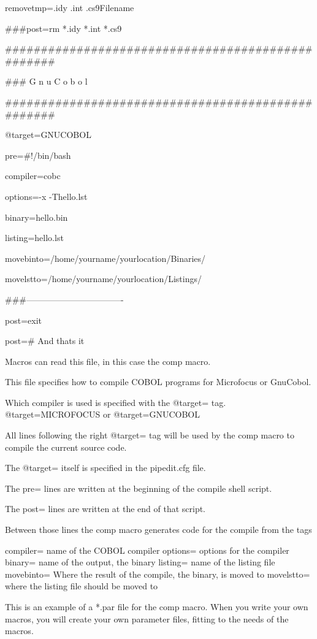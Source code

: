 \documentclass{report}
\begin{document}
removetmp=.idy .int .cs9Filename

\#\#\#post=rm *.idy *.int *.cs9

\#\#\#\#\#\#\#\#\#\#\#\#\#\#\#\#\#\#\#\#\#\#\#\#\#\#\#\#\#\#\#\#\#\#\#\#\#\#\#\#\#\#\#\#\#\#\#\#\#\#

\#\#\# G n u C o b o l 

\#\#\#\#\#\#\#\#\#\#\#\#\#\#\#\#\#\#\#\#\#\#\#\#\#\#\#\#\#\#\#\#\#\#\#\#\#\#\#\#\#\#\#\#\#\#\#\#\#\#

@target=GNUCOBOL

pre=\#!/bin/bash

compiler=cobc

options=-x -Thello.lst

binary=hello.bin

listing=hello.lst

movebinto=/home/yourname/yourlocation/Binaries/

movelstto=/home/yourname/yourlocation/Listings/

\#\#\#----------------------------------

post=exit

post=\# And thats it


Macros can read this file, in this case the comp macro.

This file specifies how to compile COBOL programs for Microfocus or GnuCobol.

Which compiler is used is specified with the @target= tag.
@target=MICROFOCUS 		or
@target=GNUCOBOL

All lines following the right @target= tag will be used by the comp macro to compile the current source code.

The @target= itself is specified in the pipedit.cfg file.

The pre= lines are written at the beginning of the compile shell script.

The post= lines are written at the end of that script.

Between those lines the comp macro generates code for the compile from the tags

compiler=
name of the COBOL compiler
options=
options for the compiler
binary=
name of the output, the binary
listing=
name of the listing file
movebinto=
Where the result of the compile, the binary, is moved to
movelstto=
where the listing file should be moved to


This is an example of a *.par file for the comp macro.
When you write your own macros, you will create your own parameter files, fitting to the needs of the macros.
\end{document}
